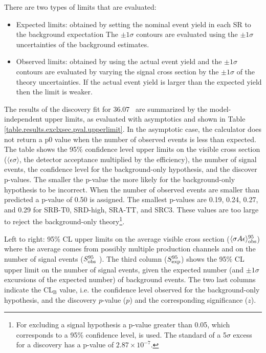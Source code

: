 There are two types of limits that are evaluated: 

\begin{itemize}
\item Expected limits: obtained by setting the nominal event yield in each SR to the background expectation The $\pm 1 \sigma$ contours are evaluated using the  $\pm 1 \sigma$ uncertainties of the background estimates.
\item Observed limits: obtained by using the actual event yield and the $\pm 1 \sigma$ contours are evaluated by varying the signal cross section by the $\pm 1 \sigma$ of the theory uncertainties.  If the actual event yield is larger than the expected yield then the limit is weaker.
\end{itemize}



The results of the discovery fit for 36.07 \ifb\ are summarized by the
model-independent upper limits, as evaluated with asymptotics
and shown in Table \ref{table.results.exclxsec.pval.upperlimit}. In the asymptotic case, the calculator does not return a p0 value when the number of observed events is less than expected.  The table shows the 95\% confidence level upper limits on the visible cross section ($\langle \epsilon \sigma \rangle$, the detector acceptance multiplied by the efficiency), the number of signal events, the confidence level for the background-only hypothesis, and the discover p-values.  The smaller the p-value the more likely for the background-only hypothesis to be incorrect.  When the number of observed events are smaller than predicted a p-value of 0.50 is assigned.  The smallest p-values are 0.19, 0.24, 0.27, and 0.29 for SRB-T0, SRD-high, SRA-TT, and SRC3.  These values are too large to reject the background-only theory\footnote{For excluding a signal hypothesis a p-value greater than 0.05, which corresponds to a 95\% confidence level, is used.  The standard of a 5$\sigma$ excess for a discovery has a p-value of $2.87 \times 10^{-7}$.}. \\

\begin{table}[htpb]
  \caption[95\% CL upper limits]{Left to right: 95\% CL upper limits on the average visible cross section
($\langle\sigma A \epsilon\rangle_{\rm obs}^{95}$) where the average comes from possibly multiple production channels and on the number of
signal events ($S_{\rm obs}^{95}$ ).  The third column
($S_{\rm exp}^{95}$) shows the 95\% CL upper limit on the number of
signal events, given the expected number (and $\pm 1\sigma$
excursions of the expected number) of background events.
The two last columns indicate the CL$_\mathrm{B}$ value, i.e. the confidence level observed for the background-only hypothesis, and the discovery $p$-value ($p$) and the corresponding significance ($z$).
}
\label{tab:upLimits}

\begin{center}
    
\end{center}
\end{table}
%
\clearpage


